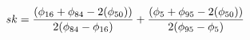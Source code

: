 \documentclass[10pt]{article}
\begin{document}
\begin{align*}sk= {(\phi_{16} + \phi_{84} - 2 (\phi_{50})) \over 2(\phi_{84} - \phi_{16})} + {(\phi_{5} + \phi_{95} - 2 (\phi_{50})) \over 2(\phi_{95} - \phi_{5})}\end{align*}
\end{document}
